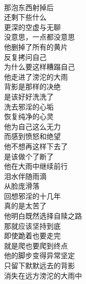 \begin{poem}[雨中的背影]
    \begin{multicols}{3}
        \centering~\\
        那泡东西射掉后 \\ 还剩下些什么 \\ 更深的空虚与无聊 \\ 没意思，一点都没意思 \\ 他删掉了所有的黄片 \\ 反复拷问自己 \\ 为什么要这样糟蹋自己 \\ 他走进了滂沱的大雨 \\ 背影是那样的决绝 \\ 是该好好洗洗了 \\ 洗去邪淫的心垢 \\ 恢复纯净的心灵 \\ 他为自己这么无力 \\ 而感到愤怒和绝望 \\ 他不想再这样下去了 \\ 是该做个了断了 \\ 他在大雨中继续前行 \\ 泪水伴随雨滴 \\ 从脸庞滑落 \\ 回想邪淫的十几年 \\ 真的是太苦了 \\ 他明白既然选择自赎之路 \\ 那就应该坚持到底 \\ 即使跪着也要走完 \\ 就是爬也要爬到终点 \\ 他的脚步变得异常坚定 \\ 只留下默默远去的背影 \\ 消失在远方滂沱的大雨中
    \end{multicols}
\end{poem}

